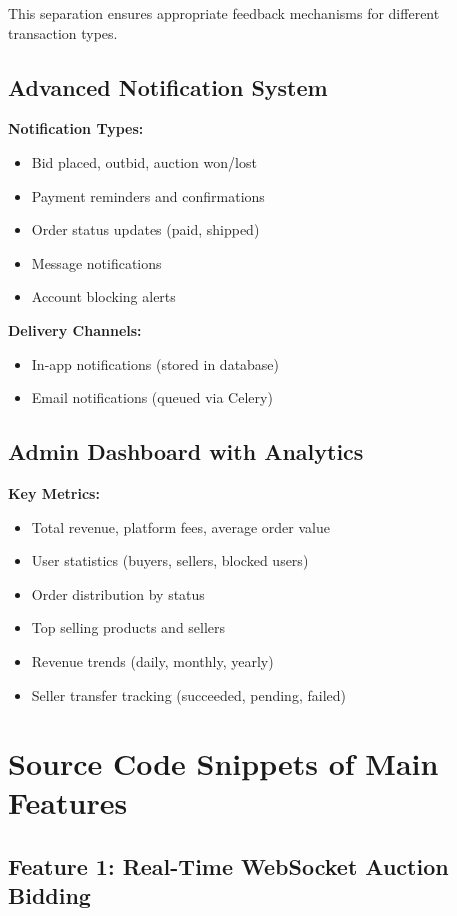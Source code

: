 \documentclass[12pt,a4paper]{article}
\begin{document}
This separation ensures appropriate feedback mechanisms for different transaction types.

\subsection{Advanced Notification System}
\textbf{Notification Types:}
\begin{itemize}
    \item Bid placed, outbid, auction won/lost
    \item Payment reminders and confirmations
    \item Order status updates (paid, shipped)
    \item Message notifications
    \item Account blocking alerts
\end{itemize}

\textbf{Delivery Channels:}
\begin{itemize}
    \item In-app notifications (stored in database)
    \item Email notifications (queued via Celery)
\end{itemize}

\subsection{Admin Dashboard with Analytics}
\textbf{Key Metrics:}
\begin{itemize}
    \item Total revenue, platform fees, average order value
    \item User statistics (buyers, sellers, blocked users)
    \item Order distribution by status
    \item Top selling products and sellers
    \item Revenue trends (daily, monthly, yearly)
    \item Seller transfer tracking (succeeded, pending, failed)
\end{itemize}

\newpage

\section{Source Code Snippets of Main Features}

\subsection{Feature 1: Real-Time WebSocket Auction Bidding}
\end{document}
